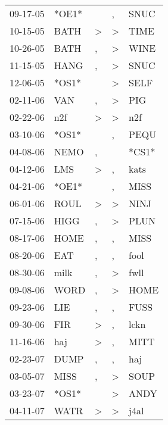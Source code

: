 \begin{supertabular}{lllll}
 09-17-05 &  *OE1* &                  &                , &   SNUC \\
 10-15-05 &   BATH &     \textgreater &     \textgreater &   TIME \\
 10-26-05 &   BATH &                , &     \textgreater &   WINE \\
 11-15-05 &   HANG &                , &     \textgreater &   SNUC \\
 12-06-05 &  *OS1* &                  &     \textgreater &   SELF \\
 02-11-06 &    VAN &                , &     \textgreater &    PIG \\
 02-22-06 &    n2f &     \textgreater &     \textgreater &    n2f \\
 03-10-06 &  *OS1* &                  &                , &   PEQU \\
 04-08-06 &   NEMO &                , &                  &  *CS1* \\
 04-12-06 &    LMS &     \textgreater &                , &   kats \\
 04-21-06 &  *OE1* &                  &                , &   MISS \\
 06-01-06 &   ROUL &     \textgreater &     \textgreater &   NINJ \\
 07-15-06 &   HIGG &                , &     \textgreater &   PLUN \\
 08-17-06 &   HOME &                , &                , &   MISS \\
 08-20-06 &    EAT &                , &                , &   fool \\
 08-30-06 &   milk &                , &     \textgreater &   fwll \\
 09-08-06 &   WORD &                , &     \textgreater &   HOME \\
 09-23-06 &    LIE &                , &                , &   FUSS \\
 09-30-06 &    FIR &     \textgreater &                , &   lckn \\
 11-16-06 &    haj &     \textgreater &                , &   MITT \\
 02-23-07 &   DUMP &                , &                , &    haj \\
 03-05-07 &   MISS &                , &     \textgreater &   SOUP \\
 03-23-07 &  *OS1* &                  &     \textgreater &   ANDY \\
 04-11-07 &   WATR &     \textgreater &     \textgreater &   j4al \\

\end{supertabular}
